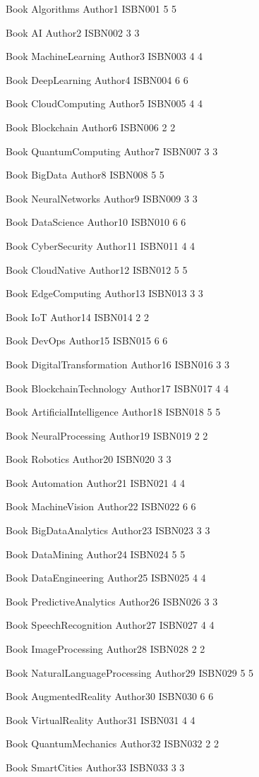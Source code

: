 Book
Algorithms Author1 ISBN001 5 5

Book
AI Author2 ISBN002 3 3

Book
MachineLearning Author3 ISBN003 4 4

Book
DeepLearning Author4 ISBN004 6 6

Book
CloudComputing Author5 ISBN005 4 4

Book
Blockchain Author6 ISBN006 2 2

Book
QuantumComputing Author7 ISBN007 3 3

Book
BigData Author8 ISBN008 5 5

Book
NeuralNetworks Author9 ISBN009 3 3

Book
DataScience Author10 ISBN010 6 6

Book
CyberSecurity Author11 ISBN011 4 4

Book
CloudNative Author12 ISBN012 5 5

Book
EdgeComputing Author13 ISBN013 3 3

Book
IoT Author14 ISBN014 2 2

Book
DevOps Author15 ISBN015 6 6

Book
DigitalTransformation Author16 ISBN016 3 3

Book
BlockchainTechnology Author17 ISBN017 4 4

Book
ArtificialIntelligence Author18 ISBN018 5 5

Book
NeuralProcessing Author19 ISBN019 2 2

Book
Robotics Author20 ISBN020 3 3

Book
Automation Author21 ISBN021 4 4

Book
MachineVision Author22 ISBN022 6 6

Book
BigDataAnalytics Author23 ISBN023 3 3

Book
DataMining Author24 ISBN024 5 5

Book
DataEngineering Author25 ISBN025 4 4

Book
PredictiveAnalytics Author26 ISBN026 3 3

Book
SpeechRecognition Author27 ISBN027 4 4

Book
ImageProcessing Author28 ISBN028 2 2

Book
NaturalLanguageProcessing Author29 ISBN029 5 5

Book
AugmentedReality Author30 ISBN030 6 6

Book
VirtualReality Author31 ISBN031 4 4

Book
QuantumMechanics Author32 ISBN032 2 2

Book
SmartCities Author33 ISBN033 3 3

